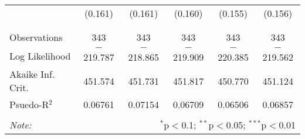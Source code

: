 \begin{table}[H]
\begin{tabular}{@{\extracolsep{5pt}}lccccc}
  & (0.161) & (0.161) & (0.160) & (0.155) & (0.156) \\ 
  & & & & & \\ 
\hline \\[-1.8ex] 
Observations & 343 & 343 & 343 & 343 & 343 \\ 
Log Likelihood & $-$219.787 & $-$218.865 & $-$219.909 & $-$220.385 & $-$219.562 \\ 
Akaike Inf. Crit. & 451.574 & 451.731 & 451.817 & 450.770 & 451.124 \\ 
Psuedo-R$^{2}$ & 0.06761 & 0.07154 & 0.06709 & 0.06506 & 0.06857 \\
\hline 
\hline \\[-1.8ex] 
\textit{Note:}  & \multicolumn{5}{r}{$^{*}$p$<$0.1; $^{**}$p$<$0.05; $^{***}$p$<$0.01} \\ 
\end{tabular} 
\end{table} 

